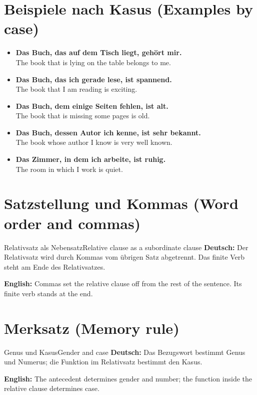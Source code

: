 \documentclass[a4paper,11pt]{article}
\newcommand{\GermanText}[1]{\textbf{Deutsch: }#1\par}
\newcommand{\EnglishText}[1]{{\small\color{SoftGray}\textbf{English: }#1\par}}
\newcommand{\ExampleItem}[2]{\item \textbf{#1}\\{\small\color{SoftGray}#2}}
\begin{document}
\section{Beispiele nach Kasus (Examples by case)}
\begin{exbox}\begin{itemize}
\ExampleItem{Das Buch, das auf dem Tisch liegt, gehört mir.}{The book that is lying on the table belongs to me.}
\ExampleItem{Das Buch, das ich gerade lese, ist spannend.}{The book that I am reading is exciting.}
\ExampleItem{Das Buch, dem einige Seiten fehlen, ist alt.}{The book that is missing some pages is old.}
\ExampleItem{Das Buch, dessen Autor ich kenne, ist sehr bekannt.}{The book whose author I know is very well known.}
\ExampleItem{Das Zimmer, in dem ich arbeite, ist ruhig.}{The room in which I work is quiet.}
\end{itemize}\end{exbox}

\section{Satzstellung und Kommas (Word order and commas)}
\begin{grammarentry}{Relativsatz als Nebensatz}{Relative clause as a subordinate clause}
\GermanText{Der Relativsatz wird durch Kommas vom übrigen Satz abgetrennt. Das finite Verb steht am Ende des Relativsatzes.}
\EnglishText{Commas set the relative clause off from the rest of the sentence. Its finite verb stands at the end.}
\end{grammarentry}

\section{Merksatz (Memory rule)}
\begin{grammarentry}{Genus und Kasus}{Gender and case}
\GermanText{Das Bezugswort bestimmt Genus und Numerus; die Funktion im Relativsatz bestimmt den Kasus.}
\EnglishText{The antecedent determines gender and number; the function inside the relative clause determines case.}
\end{grammarentry}
\end{document}

